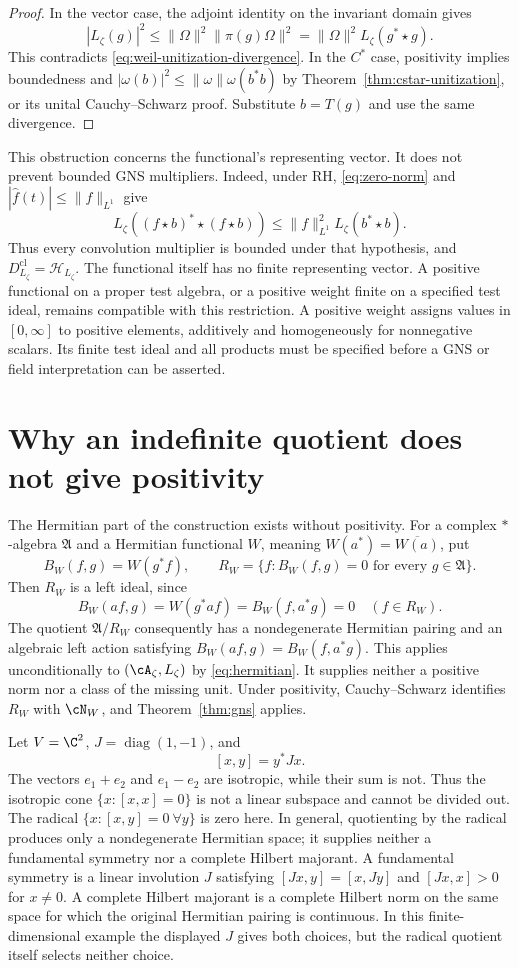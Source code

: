 \begin{proof}
In the vector case, the adjoint identity on the invariant domain gives
\[
 |L_\zeta(g)|^2
 \leq\|\Omega\|^2\|\pi(g)\Omega\|^2
 =\|\Omega\|^2L_\zeta(g^*\star g).
\]
This contradicts \eqref{eq:weil-unitization-divergence}.
In the $C^*$ case, positivity implies boundedness and
$|\omega(b)|^2\leq\|\omega\|\omega(b^*b)$ by
Theorem~\ref{thm:cstar-unitization}, or its unital Cauchy--Schwarz proof.
Substitute $b=T(g)$ and use the same divergence.
\end{proof}

This obstruction concerns the functional's representing vector.
It does not prevent bounded GNS multipliers.  Indeed, under RH,
\eqref{eq:zero-norm} and $|\widehat f(t)|\leq\|f\|_{L^1}$ give
\[
 L_\zeta((f\star b)^*\star(f\star b))
 \leq\|f\|_{L^1}^2 L_\zeta(b^*\star b).
\]
Thus every convolution multiplier is bounded under that hypothesis,
and $D_{L_\zeta}^{\mathrm{cl}}=\mathcal H_{L_\zeta}$.
The functional itself has no finite representing vector.
A positive functional on a proper test algebra, or a positive weight
finite on a specified test ideal, remains compatible with this restriction.
A positive weight assigns values in $[0,\infty]$ to positive elements,
additively and homogeneously for nonnegative scalars.  Its finite test
ideal and all products must be specified before a GNS or field
interpretation can be asserted.

\section{Why an indefinite quotient does not give positivity}

The Hermitian part of the construction exists without positivity.
For a complex $*$-algebra $\mathfrak A$ and a Hermitian functional $W$,
meaning $W(a^*)=\overline{W(a)}$, put
\[
 B_W(f,g)=W(g^*f),\qquad
 R_W=\{f:B_W(f,g)=0\text{ for every }g\in\mathfrak A\}.
\]
Then $R_W$ is a left ideal, since
\[
 B_W(af,g)=W(g^*af)=B_W(f,a^*g)=0\quad(f\in R_W).
\]
The quotient $\mathfrak A/R_W$ consequently has a nondegenerate Hermitian
pairing and an algebraic left action satisfying
$B_W(af,g)=B_W(f,a^*g)$.
This applies unconditionally to $(\cA_\zeta,L_\zeta)$ by
\eqref{eq:hermitian}.  It supplies neither a positive norm nor a class of
the missing unit.  Under positivity, Cauchy--Schwarz identifies $R_W$
with $\cN_W$, and Theorem~\ref{thm:gns} applies.

Let $V=\C^2$, $J=\operatorname{diag}(1,-1)$, and
\[
 [x,y]=y^*Jx.
\]
The vectors $e_1+e_2$ and $e_1-e_2$ are isotropic, while their sum is
not.  Thus the isotropic cone $\{x:[x,x]=0\}$ is not a linear subspace
and cannot be divided out.  The radical
$\{x:[x,y]=0\ \forall y\}$ is zero here.  In general, quotienting by the
radical produces only a nondegenerate Hermitian space; it supplies
neither a fundamental symmetry nor a complete Hilbert majorant.
A fundamental symmetry is a linear involution $J$ satisfying
$[Jx,y]=[x,Jy]$ and $[Jx,x]>0$ for $x\ne0$.
A complete Hilbert majorant is a complete Hilbert norm on the same space
for which the original Hermitian pairing is continuous.
In this finite-dimensional example the displayed $J$ gives both choices,
but the radical quotient itself selects neither choice.

